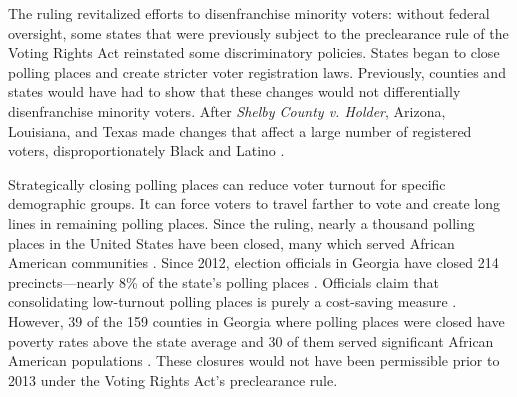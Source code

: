 \documentclass[runningheads]{llncs}
\begin{document}
The ruling revitalized efforts to 
disenfranchise minority voters:
without federal oversight, some states that were previously subject to the preclearance rule of the Voting Rights Act reinstated some discriminatory policies.
States began to close polling places and create stricter voter registration laws.
Previously, counties and states would have had to show that these changes would not differentially disenfranchise minority voters.
After \emph{Shelby County v. Holder},  
Arizona, Louisiana, and Texas made changes that
affect a large number of registered voters, disproportionately Black and Latino \cite{pew_polling_2018}.

Strategically closing polling places can reduce voter turnout for specific demographic groups.
It can force voters to travel farther to vote and create long lines in remaining polling places.
Since the ruling, nearly a thousand polling places in the United States have been closed,
many which served African American communities \cite{pew_polling_2018}. 
Since 2012, election officials in Georgia have closed 214 precincts---nearly 8\% of the state's polling 
places \cite{niesse_voting_2018}.
Officials claim that consolidating low-turnout polling places is purely a cost-saving measure \cite{whitesides_polling_2016}.
However, 39 of the 159 counties in Georgia where polling places were closed have poverty rates
above the state average and 30 of them served significant African American populations \cite{niesse_voting_2018}.
These closures would not have been permissible prior to 2013 under the Voting Rights Act's preclearance rule.


\end{document}
